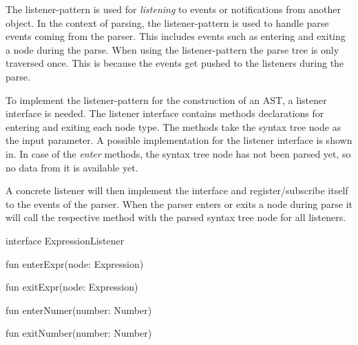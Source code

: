 The listener-pattern is used for \textit{listening} to events or notifications from another object. In the context of parsing, the listener-pattern is used to handle parse events coming from the parser. This includes events such as entering and exiting a node during the parse. When using the listener-pattern the parse tree is only traversed once. This is because the events get pushed to the listeners during the parse. 

To implement the listener-pattern for the construction of an AST, a listener interface is needed. The listener interface contains methods declarations for entering and exiting each node type. The methods take the syntax tree node as the input parameter. A possible implementation for the listener interface is shown in.  In case of the \textit{enter} methods, the syntax tree node has not been parsed yet, so no data from it is available yet.

A concrete listener will then implement the interface and register/subscribe itself to the events of the parser. When the parser enters or exits a node during parse it will call the respective method with the parsed syntax tree node for all listeners. 

\begin{KotlinCode}[float,numbers=none,caption=Implementation of the \texttt{ExpressionListener} interface., label=lst:ListPatExprList]
interface ExpressionListener {
    fun enterExpr(node: Expression)

    fun exitExpr(node: Expression)

    fun enterNumer(number: Number)

    fun exitNumber(number: Number)
}
  \end{KotlinCode}


